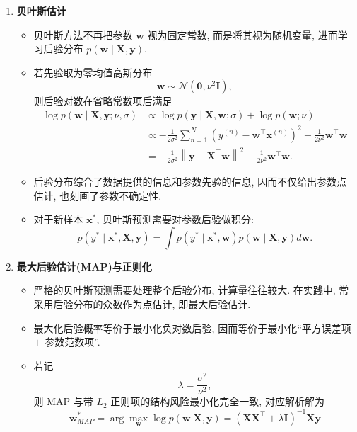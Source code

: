 \documentclass{../nndlcourse}
\begin{document}
\begin{enumerate}
    \item \textbf{贝叶斯估计}
    \begin{itemize}
    \item 贝叶斯方法不再把参数 $\boldsymbol{w}$ 视为固定常数, 而是将其视为随机变量, 进而学习后验分布 $p(\boldsymbol{w} \mid \boldsymbol{X}, \boldsymbol{y})$.
    \item 若先验取为零均值高斯分布
    \begin{equation*}
    \boldsymbol{w} \sim \mathcal{N}(\boldsymbol{0}, \nu^2 \boldsymbol{I}),
    \end{equation*}
    则后验对数在省略常数项后满足
        \begin{align*}
        \log p(\boldsymbol{w} \mid \boldsymbol{X}, \boldsymbol{y} ; \nu, \sigma) & \propto \log p(\boldsymbol{y} \mid \boldsymbol{X}, \boldsymbol{w} ; \sigma)+\log p(\boldsymbol{w} ; \nu) \\
    & \propto -\frac{1}{2 \sigma^2} \sum_{n=1}^N \left(y^{(n)}-\boldsymbol{w}^{\top} \boldsymbol{x}^{(n)}\right)^2 - \frac{1}{2 \nu^2} \boldsymbol{w}^{\top} \boldsymbol{w} \\
    & = -\frac{1}{2 \sigma^2}\left\|\boldsymbol{y}-\boldsymbol{X}^{\top} \boldsymbol{w}\right\|^2 - \frac{1}{2 \nu^2} \boldsymbol{w}^{\top} \boldsymbol{w}.
        \end{align*}
    \item 后验分布综合了数据提供的信息和参数先验的信息, 因而不仅给出参数点估计, 也刻画了参数不确定性.
    \item 对于新样本 $\boldsymbol{x}^*$, 贝叶斯预测需要对参数后验做积分:
        \begin{equation*}
      p(y^* \mid \boldsymbol{x}^*, \boldsymbol{X}, \boldsymbol{y}) = \int p(y^* \mid \boldsymbol{x}^*, \boldsymbol{w}) p(\boldsymbol{w} \mid \boldsymbol{X}, \boldsymbol{y}) d\boldsymbol{w}.
        \end{equation*}
    \end{itemize}

    \item \textbf{最大后验估计(MAP)与正则化}
    \begin{itemize}
    \item 严格的贝叶斯预测需要处理整个后验分布, 计算量往往较大. 在实践中, 常采用后验分布的众数作为点估计, 即最大后验估计.
    \item 最大化后验概率等价于最小化负对数后验, 因而等价于最小化“平方误差项 $+$ 参数范数项”.
    \item 若记
    \begin{equation*}
    \lambda = \frac{\sigma^2}{\nu^2},
    \end{equation*}
    则 MAP 与带 $L_2$ 正则项的结构风险最小化完全一致, 对应解析解为
        \begin{equation*}
        \boldsymbol{w}^*_{MAP} = \arg\max_{\boldsymbol{w}} \log p(\boldsymbol{w}|\boldsymbol{X}, \boldsymbol{y}) = (\boldsymbol{X}\boldsymbol{X}^\top + \lambda \boldsymbol{I})^{-1}\boldsymbol{X}\boldsymbol{y}
        \end{equation*}
    \end{itemize}


\end{enumerate}
\end{document}
